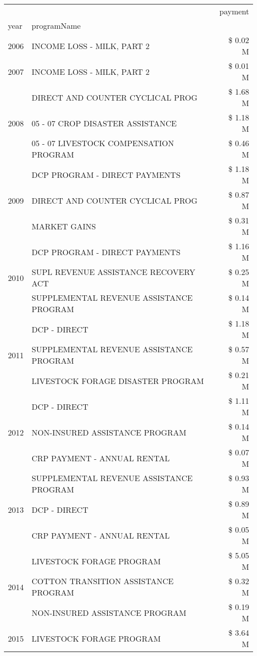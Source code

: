 \begin{tabular}{llr}
\toprule
 &  & payment \\
year & programName &  \\
\midrule
2006 & INCOME LOSS - MILK, PART 2 & \$ 0.02 M \\
\cline{1-3}
2007 & INCOME LOSS - MILK, PART 2 & \$ 0.01 M \\
\cline{1-3}
\multirow[t]{3}{*}{2008} & DIRECT AND COUNTER CYCLICAL PROG & \$ 1.68 M \\
 & 05 - 07 CROP DISASTER ASSISTANCE & \$ 1.18 M \\
 & 05 - 07 LIVESTOCK COMPENSATION PROGRAM & \$ 0.46 M \\
\cline{1-3}
\multirow[t]{3}{*}{2009} & DCP PROGRAM - DIRECT PAYMENTS & \$ 1.18 M \\
 & DIRECT AND COUNTER CYCLICAL PROG & \$ 0.87 M \\
 & MARKET GAINS & \$ 0.31 M \\
\cline{1-3}
\multirow[t]{3}{*}{2010} & DCP PROGRAM - DIRECT PAYMENTS & \$ 1.16 M \\
 & SUPL REVENUE ASSISTANCE RECOVERY ACT & \$ 0.25 M \\
 & SUPPLEMENTAL REVENUE ASSISTANCE PROGRAM & \$ 0.14 M \\
\cline{1-3}
\multirow[t]{3}{*}{2011} & DCP - DIRECT & \$ 1.18 M \\
 & SUPPLEMENTAL REVENUE ASSISTANCE PROGRAM & \$ 0.57 M \\
 & LIVESTOCK FORAGE DISASTER PROGRAM & \$ 0.21 M \\
\cline{1-3}
\multirow[t]{3}{*}{2012} & DCP - DIRECT & \$ 1.11 M \\
 & NON-INSURED ASSISTANCE PROGRAM & \$ 0.14 M \\
 & CRP PAYMENT - ANNUAL RENTAL & \$ 0.07 M \\
\cline{1-3}
\multirow[t]{3}{*}{2013} & SUPPLEMENTAL REVENUE ASSISTANCE PROGRAM & \$ 0.93 M \\
 & DCP - DIRECT & \$ 0.89 M \\
 & CRP PAYMENT - ANNUAL RENTAL & \$ 0.05 M \\
\cline{1-3}
\multirow[t]{3}{*}{2014} & LIVESTOCK FORAGE PROGRAM & \$ 5.05 M \\
 & COTTON TRANSITION ASSISTANCE PROGRAM & \$ 0.32 M \\
 & NON-INSURED ASSISTANCE PROGRAM & \$ 0.19 M \\
\cline{1-3}
\multirow[t]{3}{*}{2015} & LIVESTOCK FORAGE PROGRAM & \$ 3.64 M \\

\end{tabular}
